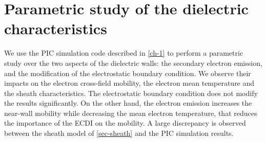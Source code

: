 



\chapter{Parametric study of the dielectric characteristics}
\label{ch-2}

\begin{Chabstract}
We use the PIC simulation code described in \cref{ch-1} to perform a parametric study over the two aspects of the dielectric walls\string: the secondary electron emission, and the modification of the electrostatic boundary condition.
We observe their impacts on the electron cross-field mobility, the electron mean temperature and the sheath characteristics.
The electrostatic boundary condition does not modify the results significantly.
On the other hand, the electron emission increases the near-wall mobility while decreasing the mean electron temperature, that reduces the importance of the \ac{ECDI} on the mobility.
A large discrepancy is observed between the sheath model of \cref{sec-sheath} and the PIC simulation results.
\end{Chabstract}



\minitoc


% 
% 
% 
% 
% 
% 
% 




% 
% 
% 
% 
% 
% 
